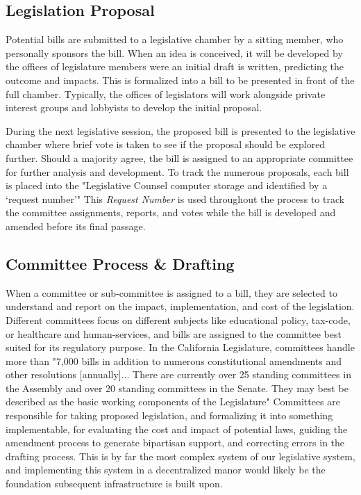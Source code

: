 \documentclass[letterpaper,twocolumn]{article}
\begin{document}
\subsection*{Legislation Proposal}
Potential bills are submitted to a legislative chamber by a sitting member, who personally sponsors the bill.  When an idea is conceived, it will be developed by the offices of legislature members were an initial draft is written, predicting the outcome and impacts.  This is formalized into a bill to be presented in front of the full chamber. Typically, the offices of legislators will work alongside private interest groups and lobbyists to develop the initial proposal. 

During the next legislative session, the proposed bill is presented to the legislative chamber where brief vote is taken to see if the proposal should be explored further.  Should a majority agree, the bill is assigned to an appropriate committee for further analysis and development.  To track the numerous proposals, each bill is placed into the "Legislative Counsel computer storage and identified by a ‘request number’" \cite{Legislative_Process}  This \textit{Request Number} is used throughout the process to track the committee assignments, reports, and votes while the bill is developed and amended before its final passage.

\subsection*{Committee Process \& Drafting}
When a committee or sub-committee is assigned to a bill, they are selected to understand and report on the impact, implementation, and cost of the legislation. Different committees focus on different subjects like educational policy, tax-code, or healthcare and human-services, and bills are assigned to the committee best suited for its regulatory purpose.  In the California Legislature, committees handle more than "7,000 bills in addition to numerous constitutional amendments and other resolutions [annually]... There are currently over 25 standing committees in the Assembly and over 20 standing committees in the Senate. They may best be described as the basic working components of the Legislature" \cite{Legislative_Process}  Committees are responsible for taking proposed legislation, and formalizing it into something implementable, for evaluating the cost and impact of potential laws, guiding the amendment process to generate bipartisan support, and correcting errors in the drafting process.  This is by far the most complex system of our legislative system, and implementing this system in a decentralized manor would likely be the foundation subsequent infrastructure is built upon.
\end{document}
